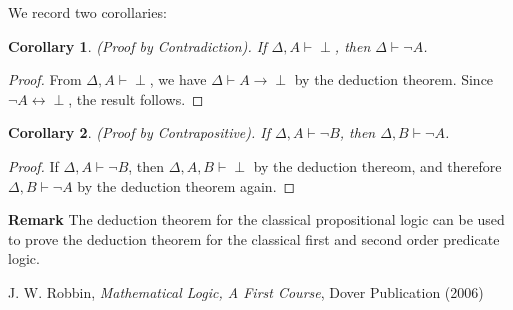 \documentclass[12pt]{article}
\newtheorem{cor}{Corollary}
\begin{document}
We record two corollaries:
\begin{cor} (Proof by Contradiction).  If $\Delta, A \vdash \perp$, then $\Delta \vdash \neg A$. \end{cor}
\begin{proof} From $\Delta, A \vdash \perp$, we have $\Delta \vdash A\to \perp$ by the deduction theorem.  Since $\neg A \leftrightarrow \perp$, the result follows.  \end{proof}

\begin{cor} (Proof by Contrapositive).  If $\Delta, A \vdash \neg B$, then $\Delta, B \vdash \neg A$. \end{cor}
\begin{proof} If $\Delta, A \vdash \neg B$, then $\Delta, A,B \vdash \perp$ by the deduction thereom, and therefore $\Delta, B \vdash \neg A$ by the deduction theorem again.  \end{proof}

\textbf{Remark}  The deduction theorem for the classical propositional logic can be used to prove the deduction theorem for the classical first and second order predicate logic.

\begin{thebibliography}{7}
 J. W. Robbin, {\it Mathematical Logic, A First Course}, Dover Publication (2006)
\end{thebibliography}

\end{document}
